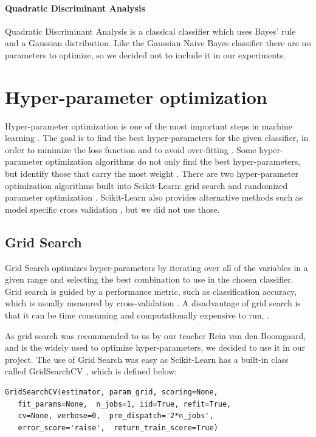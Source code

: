 \documentclass{article}
\begin{document}
	\paragraph{Quadratic Discriminant Analysis}
		Quadratic Discriminant Analysis is a classical classifier which uses Bayes' rule and a Gaussian distribution. Like the Gaussian Naive Bayes classifier there are no parameters to optimize, so we decided not to include it in our experiments.


\section{Hyper-parameter optimization}

	Hyper-parameter optimization is one of the most important steps in machine learning \cite{bardenet}. The goal is to find the best hyper-parameters for the given classifier, in order to minimize the loss function and to avoid over-fitting \cite{Bergstra}. Some hyper-parameter optimization algorithms do not only find the best hyper-parameters, but identify those that carry the most weight \cite{Bergstra}.
	There are two hyper-parameter optimization algorithms built into Scikit-Learn: grid search and randomized parameter optimization \cite{gridsearch}. Scikit-Learn also provides alternative methods such as model specific cross validation  \cite{hyper-parameteroptimizationWiki}, but we did not use those.  
	
	\subsection{Grid Search}
	
		Grid Search optimizes hyper-parameters by iterating over all of the variables in a given range and selecting the best combination to use in the chosen classifier. Grid search is guided by a performance metric, such as classification accuracy, which is usually measured by cross-validation \cite{hyper-parameteroptimizationWiki}. A disadvantage of grid search is that it can be time consuming and computationally expensive to run, \cite{hyper-parameteroptimizationWiki}.

		As grid search was recommended to us by our teacher Rein van den Boomgaard, and is the widely used to optimize hyper-parameters, we decided to use it in our project.
The use of Grid Search was easy as Scikit-Learn has a built-in class called GridSearchCV \cite{gridsearch}, which is defined below:
		
		
	\begin{lstlisting}
GridSearchCV(estimator, param_grid, scoring=None,
   fit_params=None,  n_jobs=1, iid=True, refit=True,
   cv=None, verbose=0,  pre_dispatch='2*n_jobs',
   error_score='raise',  return_train_score=True)
	\end{lstlisting}
		
\end{document}
